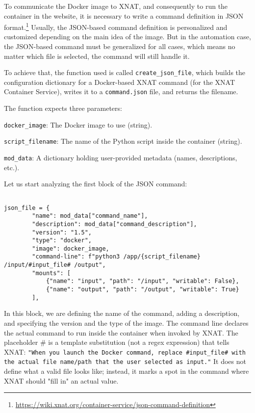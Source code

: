 To communicate the Docker image to XNAT, and consequently to run the container in the website, it is necessary to write a command definition in JSON format.\footnote{\url{https://wiki.xnat.org/container-service/json-command-definition}}
Usually, the JSON-based command definition is personalized and customized depending on the main idea of the image. But in the automation case, the JSON-based command must be generalized for all cases, which means no matter which file is selected, the command will still handle it.

To achieve that, the function used is called \texttt{create\_json\_file}, which builds the configuration dictionary for a Docker-based XNAT command (for the XNAT Container Service), writes it to a \texttt{command.json} file, and returns the filename.

The function expects three parameters:

\texttt{docker\_image}: The Docker image to use (string).

\texttt{script\_filename}: The name of the Python script inside the container (string).

\texttt{mod\_data}: A dictionary holding user-provided metadata (names, descriptions, etc.).

Let us start analyzing the first block of the JSON command:
\begin{lstlisting}

json_file = {
        "name": mod_data["command_name"],
        "description": mod_data["command_description"],
        "version": "1.5",
        "type": "docker",
        "image": docker_image,
        "command-line": f"python3 /app/{script_filename} /input/#input_file# /output",
        "mounts": [
            {"name": "input", "path": "/input", "writable": False},
            {"name": "output", "path": "/output", "writable": True}
        ],
\end{lstlisting}


In this block, we are defining the name of the command, adding a description, and specifying the version and the type of the image.
The command line declares the actual command to run inside the container when invoked by XNAT. The placeholder \# is a template substitution (not a regex expression) that tells XNAT: \texttt{"When you launch the Docker command, replace \#input\_file\# with the actual file name/path that the user selected as input."} It does not define what a valid file looks like; instead, it marks a spot in the command where XNAT should "fill in" an actual value.


